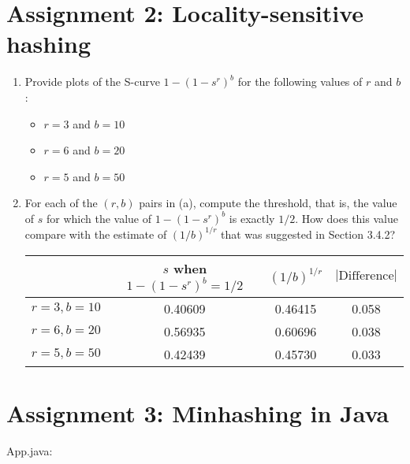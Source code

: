 \documentclass{article}
\begin{document}
\section{Assignment 2: Locality-sensitive hashing}
\begin{enumerate}
\item{Provide plots of the S-curve $1-(1-s^r)^b$ for the following values of $r$ and $b$:
	\begin{itemize}
		\item{$r=3$ and $b=10$
			
		}
		\item{$r=6$ and $b=20$
			
		}
		\item{$r=5$ and $b=50$
			
		}
	\end{itemize}
}

\item{For each of the $(r,b)$ pairs in (a), compute the threshold, that is, the value of $s$ for which the value of $1-(1-s^r)^b$ is exactly $1/2$. How does this value compare with the estimate of $(1/b)^{1/r}$ that was suggested in Section 3.4.2?

\begin{center}
	\begin{tabular}{ c | c | c | c }
		           & \makecell{$s$ when \\ $1-(1-s^r)^b=1/2$} & $(1/b)^{1/r}$ & $|\text{Difference}|$ \\ \hline\hline
		$r=3,b=10$ & 0.40609                                  & 0.46415       & 0.058                  \\
		$r=6,b=20$ & 0.56935                                  & 0.60696       & 0.038                  \\
		$r=5,b=50$ & 0.42439                                  & 0.45730       & 0.033
	\end{tabular}
\end{center}
}
\end{enumerate}

\section{Assignment 3: Minhashing in Java}
App.java: \\
\lstset{breaklines=true}

\end{document}
